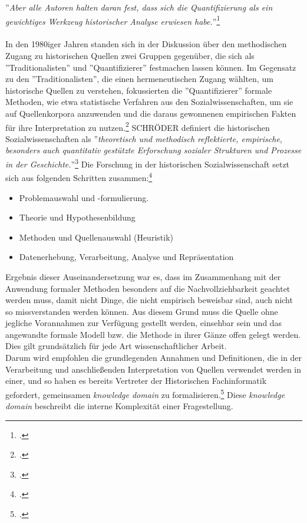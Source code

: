 \documentclass[12pt,a4paper]{article}
\begin{document}
''\textit{Aber alle Autoren halten daran fest, dass sich die Quantifizierung als ein gewichtiges Werkzeug historischer Analyse erwiesen habe.}''\footcite[][S.191-206]{jarausch1985quantitative}
\\
\\
In den 1980iger Jahren standen sich in der Diskussion über den methodischen Zugang zu historischen Quellen zwei Gruppen gegenüber, die sich als ''Traditionalisten'' und ''Quantifizierer'' festmachen lassen können. Im Gegensatz zu den ''Traditionalisten'', die einen hermeneutischen Zugang wählten, um historische Quellen zu verstehen, fokussierten die ''Quantifizierer'' formale Methoden, wie etwa statistische Verfahren aus den Sozialwissenschaften, um sie auf Quellenkorpora anzuwenden und die daraus gewonnenen empirischen Fakten für ihre Interpretation zu nutzen.\footcite[][S.191-206]{jarausch1985quantitative} 
SCHRÖDER definiert die historischen Sozialwissenschaften als
 ''\textit{theoretisch und methodisch reflektierte, empirische, besonders auch quantitativ gestützte Erforschung sozialer Strukturen und Prozesse in der Geschichte.}''\footcite[][S.5]{schroder1988historische} Die Forschung in der historischen Sozialwissenschaft setzt sich aus folgenden Schritten zusammen:\footcite[][S.5-8]{schroder1988historische} 
 \begin{itemize}
 \item Problemauswahl und -formulierung.
 \item Theorie und Hypothesenbildung
 \item Methoden und Quellenauswahl (Heuristik)
 \item Datenerhebung, Verarbeitung, Analyse und Repräsentation
 \end{itemize}
Ergebnis dieser Auseinandersetzung war es, dass im Zusammenhang mit der Anwendung formaler Methoden besonders auf die Nachvollziehbarkeit geachtet werden muss, damit nicht Dinge, die nicht empirisch beweisbar sind, auch nicht so missverstanden werden können. Aus diesem Grund muss die Quelle ohne jegliche Vorannahmen zur Verfügung gestellt werden, einsehbar sein und das angewandte formale Modell bzw. die Methode in ihrer Gänze offen gelegt werden. Dies gilt grundsätzlich für jede Art wissenschaftlicher Arbeit.
\\
Darum wird empfohlen die grundlegenden Annahmen und Definitionen, die in der Verarbeitung und anschließenden Interpretation von Quellen verwendet werden in einer, und so haben es bereits Vertreter der Historischen Fachinformatik gefordert, gemeinsamen \textit{knowledge domain} zu formalisieren.\footcite[][S.263]{thaller2017historical} Diese \textit{knowledge domain} beschreibt die interne Komplexität einer Fragestellung.
\end{document}
